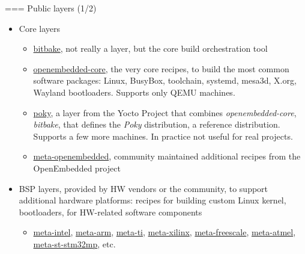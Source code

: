 === {Public layers (1/2)}
  \begin{itemize}
  \item Core layers
    \begin{itemize}
    \item \href{https://git.openembedded.org/bitbake/}{bitbake}, not
      really a layer, but the core build orchestration tool
    \item \href{https://git.openembedded.org/openembedded-core}{openembedded-core},
      the very core recipes, to build the most common software
      packages: Linux, BusyBox, toolchain, systemd, mesa3d, X.org, Wayland
      bootloaders. Supports only QEMU machines.
    \item \href{https://git.yoctoproject.org/poky/}{poky}, a layer
      from the Yocto Project that combines {\em openembedded-core},
      {\em bitbake}, that defines the {\em Poky} distribution, a
      reference distribution. Supports a few more machines. In
      practice not useful for real projects.
    \item
      \href{http://cgit.openembedded.org/meta-openembedded/}{meta-openembedded},
      community maintained additional recipes from the OpenEmbedded
      project
    \end{itemize}
  \item BSP layers, provided by HW vendors or the community, to
    support additional hardware platforms: recipes for building custom
    Linux kernel, bootloaders, for HW-related software components
    \begin{itemize}
    \item \href{https://git.yoctoproject.org/meta-intel/}{meta-intel},
      \href{https://git.yoctoproject.org/meta-arm/}{meta-arm},
      \href{https://git.yoctoproject.org/meta-ti/}{meta-ti},
      \href{https://git.yoctoproject.org/meta-xilinx/}{meta-xilinx},
      \href{https://git.yoctoproject.org/meta-freescale/}{meta-freescale},
      \href{https://github.com/linux4sam/meta-atmel}{meta-atmel},
      \href{https://github.com/STMicroelectronics/meta-st-stm32mp}{meta-st-stm32mp},
      etc.
    \end{itemize}
  \end{itemize}


